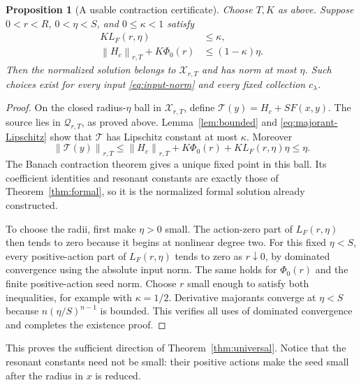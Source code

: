 \documentclass[11pt,a4paper]{article}
\numberwithin{equation}{section}
\newtheorem{proposition}[theorem]{Proposition}
\theoremstyle{definition}
\theoremstyle{remark}
\newcommand{\norm}[1]{\left\lVert #1\right\rVert}
\begin{document}
\begin{proposition}[A usable contraction certificate]
\label{prop:contraction}
Choose \(T,K\) as above. Suppose \(0<r<R\), \(0<\eta<S\), and
\(0\le\kappa<1\) satisfy
\begin{equation}\label{eq:contraction-conditions}
 \boxed{\begin{aligned}
 K L_F(r,\eta)&\le\kappa,\\
 \norm{H_c}_{r,T}+K\Phi_0(r)&\le(1-\kappa)\eta.
 \end{aligned}}
\end{equation}
Then the normalized solution belongs to \(\mathcal X_{r,T}\) and
has norm at most \(\eta\). Such choices exist for every input
\eqref{eq:input-norm} and every fixed collection \(c_\lambda\).
\end{proposition}
\begin{proof}
On the closed radius-\(\eta\) ball in \(\mathcal X_{r,T}\), define
\(\mathcal T(y)=H_c+SF(x,y)\). The source lies in
\(\mathcal Q_{r,T}\), as proved above. Lemma~\ref{lem:bounded} and
\eqref{eq:majorant-Lipschitz} show that \(\mathcal T\) has
Lipschitz constant at most \(\kappa\). Moreover
\[
 \norm{\mathcal T(y)}_{r,T}
 \le\norm{H_c}_{r,T}+K\Phi_0(r)
              +K L_F(r,\eta)\eta\le\eta.
\]
The Banach contraction theorem gives a unique fixed point in this
ball. Its coefficient identities and resonant constants are exactly
those of Theorem~\ref{thm:formal}, so it is the normalized formal
solution already constructed.

To choose the radii, first make \(\eta>0\) small. The action-zero
part of \(L_F(r,\eta)\) then tends to zero because it begins at
nonlinear degree two. For this fixed \(\eta<S\), every
positive-action part of \(L_F(r,\eta)\) tends to zero as
\(r\downarrow0\), by dominated convergence using the absolute input
norm. The same holds for \(\Phi_0(r)\) and the finite positive-action
seed norm. Choose \(r\) small enough to satisfy both inequalities,
for example with \(\kappa=1/2\). Derivative majorants converge at
\(\eta<S\) because \(n(\eta/S)^{n-1}\) is bounded. This verifies
all uses of dominated convergence and completes the existence proof.
\end{proof}

This proves the sufficient direction of
Theorem~\ref{thm:universal}. Notice that the resonant constants need
not be small: their positive actions make the seed small after the
radius in \(x\) is reduced.
\end{document}
